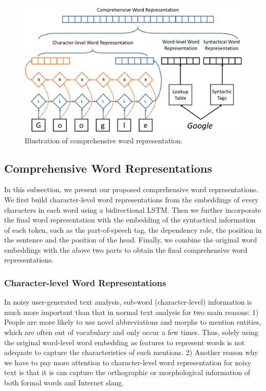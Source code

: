 \begin{figure}
	\includegraphics[width=\columnwidth]{figures/comprehensive}
	\caption{Illustration of comprehensive word representation.}
	\label{fig:comprehensive}
\end{figure}

\subsection{Comprehensive Word Representations}
In this subsection, we present our proposed comprehensive word representations. 
We first build character-level word representations from the embeddings of every characters in each word using a bidirectional LSTM. 
Then we further incorporate the final word representation with the embedding of the syntactical information of each token, such as the part-of-speech tag, the dependency role, the position in the sentence and the position of the head. 
Finally, we combine the original word embeddings with the above two parts to obtain the final comprehensive word representations.

\subsubsection{Character-level Word Representations}
In noisy user-generated text analysis, sub-word (character-level) information is much more important than that in normal text analysis for two main reasons:
1) People are more likely to use novel abbreviations and morphs to mention entities, which are often out of vocabulary and only occur a few times. 
Thus, solely using the original word-level word embedding as features to represent  words is not adequate to capture the characteristics of such mentions.
2) Another reason why we have to pay more attention to character-level word representation for noisy text is that it is can capture the orthographic or morphological information of both formal words and Internet slang. 

